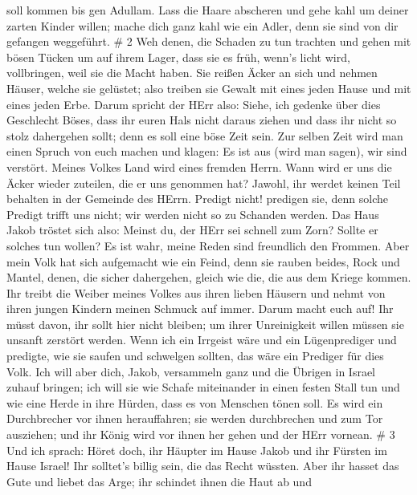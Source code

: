 soll kommen bis gen Adullam.  Lass die Haare abscheren und
gehe kahl um deiner zarten Kinder willen; mache dich ganz kahl wie ein
Adler, denn sie sind von dir gefangen weggeführt. \# 2  Weh
denen, die Schaden zu tun trachten und gehen mit bösen Tücken um auf
ihrem Lager, dass sie es früh, wenn's licht wird, vollbringen, weil sie
die Macht haben.  Sie reißen Äcker an sich und nehmen
Häuser, welche sie gelüstet; also treiben sie Gewalt mit eines jeden
Hause und mit eines jeden Erbe.  Darum spricht der HErr
also: Siehe, ich gedenke über dies Geschlecht Böses, dass ihr euren Hals
nicht daraus ziehen und dass ihr nicht so stolz dahergehen sollt; denn
es soll eine böse Zeit sein.  Zur selben Zeit wird man einen
Spruch von euch machen und klagen: Es ist aus (wird man sagen), wir sind
verstört. Meines Volkes Land wird eines fremden Herrn. Wann wird er uns
die Äcker wieder zuteilen, die er uns genommen hat?  Jawohl,
ihr werdet keinen Teil behalten in der Gemeinde des HErrn. 
Predigt nicht! predigen sie, denn solche Predigt trifft uns nicht; wir
werden nicht so zu Schanden werden.  Das Haus Jakob tröstet
sich also: Meinst du, der HErr sei schnell zum Zorn? Sollte er solches
tun wollen? Es ist wahr, meine Reden sind freundlich den Frommen.
 Aber mein Volk hat sich aufgemacht wie ein Feind, denn sie
rauben beides, Rock und Mantel, denen, die sicher dahergehen, gleich wie
die, die aus dem Kriege kommen.  Ihr treibt die Weiber
meines Volkes aus ihren lieben Häusern und nehmt von ihren jungen
Kindern meinen Schmuck auf immer.  Darum macht euch auf!
Ihr müsst davon, ihr sollt hier nicht bleiben; um ihrer Unreinigkeit
willen müssen sie unsanft zerstört werden.  Wenn ich ein
Irrgeist wäre und ein Lügenprediger und predigte, wie sie saufen und
schwelgen sollten, das wäre ein Prediger für dies Volk. 
Ich will aber dich, Jakob, versammeln ganz und die Übrigen in Israel
zuhauf bringen; ich will sie wie Schafe miteinander in einen festen
Stall tun und wie eine Herde in ihre Hürden, dass es von Menschen tönen
soll.  Es wird ein Durchbrecher vor ihnen herauffahren; sie
werden durchbrechen und zum Tor ausziehen; und ihr König wird vor ihnen
her gehen und der HErr vornean. \# 3  Und ich sprach: Höret
doch, ihr Häupter im Hause Jakob und ihr Fürsten im Hause Israel! Ihr
solltet's billig sein, die das Recht wüssten.  Aber ihr
hasset das Gute und liebet das Arge; ihr schindet ihnen die Haut ab und
